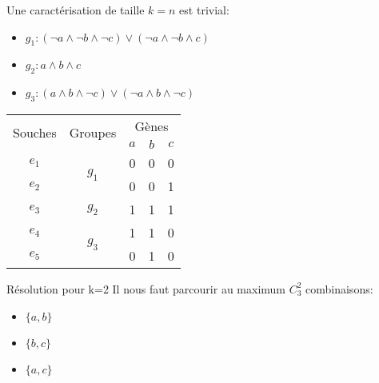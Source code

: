 \begin{overprint}
{			\begin{minipage}[r]{0.46\linewidth}
				Une caractérisation de taille $k=n$ est trivial:
				\begin{itemize}
					\item $g_1: (\lnot a \land \lnot b \land \lnot c) \lor (\lnot a \land \lnot b \land c)$
					\item<3-4> $g_2: a \land b \land c$
					\item<4> $g_3: (a \land b \land \lnot c) \lor (\lnot a \land b \land \lnot c)$ 
				\end{itemize}			
			\end{minipage}
		}
		{
			\begin{minipage}[l]{0.46\linewidth}
				\begin{center}
					\begin{tabular}{|c||c|c|c|c|}
						\hline
						\multirow{2}{*}{Souches}&\multirow{2}{*}{Groupes}&\multicolumn{3}{c|}{Gènes
						}\\
						&&$a$&$b$&$c$\\
						\hline
						\hline
						$e_1$&\multirow{2}{*}{$g_1$}& 0 & 0 & 0\\
						\cline{1-1} \cline{3-5}
						$e_2$&& 0 & 0 & 1\\
						\hline
						\hline
						$e_3$&$g_2$& 1 &  1 & 1\\
						\hline
						\hline
						$e_4$&\multirow{2}{*}{$g_3$}& 1 & 1 & 0\\
						\cline{1-1} \cline{3-5}
						$e_5$&& 0 & 1 & 0\\
						\hline
					\end{tabular}
				\end{center}
			\end{minipage}
			\hspace{0.6cm}
			\begin{minipage}[r]{0.46\linewidth}
				\begin{block}{Résolution pour k=2}
					Il nous faut parcourir au maximum $C_3^2$ combinaisons:
					\begin{itemize}
						\item $\{a,b\}$
						\item<6-7> $\{b,c\}$
						\item<7> $\{a,c\}$ 
					\end{itemize}
				\end{block}
			\end{minipage}
		}
		{
			\begin{minipage}[l]{0.46\linewidth}

\end{minipage}}
\end{overprint}
